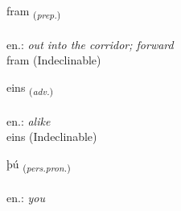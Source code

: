 \documentclass[frontgrid, backgrid]{flacards}\usepackage[]{graphicx}\usepackage[]{xcolor}
\begin{document}
{fram \small{\textsubscript{(\textit{prep.})}} \\[1ex]
\textphonetic{[fram]} \\
en.: \emph{out into the corridor; forward} \\  [2ex]
fram (Indeclinable)}


\renewcommand{\flhead}{\vskip5pt \fboxsep=0pt {\small\bfseries\footnotesize Atviksorð | Adverb}}
\renewcommand{\fcfoot}{\vskip5pt \fboxsep=0pt \hspace{2pt}{\small\bfseries\footnotesize 1K}}

\renewcommand{\blhead}{\vskip5pt {\small\bfseries\footnotesize Atviksorð | Adverb }}
\renewcommand{\bcfoot}{\vskip5pt \hspace{2pt}{\small\bfseries\footnotesize 1K}}


{eins \small{\textsubscript{(\textit{adv.})}} \\[1ex]
\textphonetic{[eins]} \\
en.: \emph{alike} \\  [2ex]
eins (Indeclinable)}

\renewcommand{\flhead}{\vskip5pt \fboxsep=0pt {\small\bfseries\footnotesize Fornafn | Pronoun}}
\renewcommand{\fcfoot}{\vskip5pt \fboxsep=0pt \hspace{2pt}{\small\bfseries\footnotesize 1K}}

\renewcommand{\blhead}{\vskip5pt {\small\bfseries\footnotesize Fornafn | Pronoun }}
\renewcommand{\bcfoot}{\vskip5pt \hspace{2pt}{\small\bfseries\footnotesize 1K}}


{þú \small{\textsubscript{(\textit{pers.pron.})}} \\[1ex] %
\textphonetic{[θuː]} \\
en.: \emph{you} \\  [2ex]
\renewcommand*{\arraystretch}{0.8}
}
\end{document}
